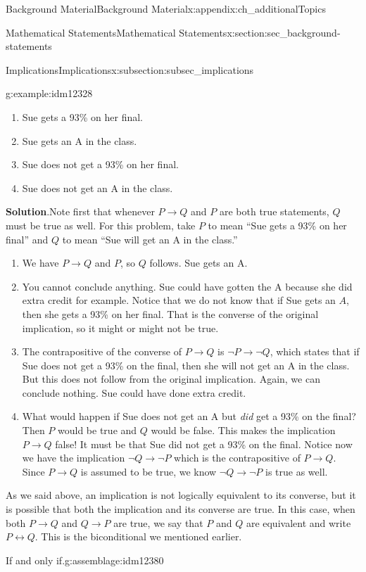 \documentclass[oneside,10pt,]{book}
\numberwithin{equation}{chapter}
\def\iff{\leftrightarrow}
\def\imp{\rightarrow}
\begin{document}
\begin{appendixptx}{Background Material}{}{Background Material}{}{}{x:appendix:ch_additionalTopics}
\begin{sectionptx}{Mathematical Statements}{}{Mathematical Statements}{}{}{x:section:sec_background-statements}
\begin{subsectionptx}{Implications}{}{Implications}{}{}{x:subsection:subsec_implications}
\begin{example}{}{g:example:idm12328}
\begin{enumerate}
\item{}Sue gets a 93\% on her final.%
\item{}Sue gets an A in the class.%
\item{}Sue does not get a 93\% on her final.%
\item{}Sue does not get an A in the class.%
\end{enumerate}
%
\par\smallskip%
\noindent\textbf{Solution}.\hypertarget{g:solution:idm12341}{}\quad{}Note first that whenever \(P \imp Q\) and \(P\) are both true statements, \(Q\) must be true as well. For this problem, take \(P\) to mean ``Sue gets a 93\% on her final'' and \(Q\) to mean ``Sue will get an A in the class.''%
\par
%
\begin{enumerate}
\item{}We have \(P \imp Q\) and \(P\), so \(Q\) follows. Sue gets an A.%
\item{}You cannot conclude anything. Sue could have gotten the A because she did extra credit for example. Notice that we do not know that if Sue gets an \(A\), then she gets a 93\% on her final. That is the converse of the original implication, so it might or might not be true.%
\item{}The contrapositive of the converse of \(P \imp Q\) is \(\neg P \imp \neg Q\), which states that if Sue does not get a 93\% on the final, then she will not get an A in the class. But this does not follow from the original implication. Again, we can conclude nothing. Sue could have done extra credit.%
\item{}What would happen if Sue does not get an A but \emph{did} get a 93\% on the final? Then \(P\) would be true and \(Q\) would be false. This makes the implication \(P \imp Q\) false! It must be that Sue did not get a 93\% on the final. Notice now we have the implication \(\neg Q \imp \neg P\) which is the contrapositive of \(P \imp Q\). Since \(P \imp Q\) is assumed to be true, we know \(\neg Q \imp \neg P\) is true as well.%
\end{enumerate}
%
\end{example}
As we said above, an implication is not logically equivalent to its converse, but it is possible that both the implication and its converse are true. In this case, when both \(P \imp Q\) and \(Q \imp P\) are true, we say that \(P\) and \(Q\) are equivalent and write \(P \iff Q\). This is the biconditional we mentioned earlier.%
\begin{assemblage}{If and only if.}{g:assemblage:idm12380}%

\end{assemblage}
\end{subsectionptx}
\end{sectionptx}
\end{appendixptx}
\end{document}
